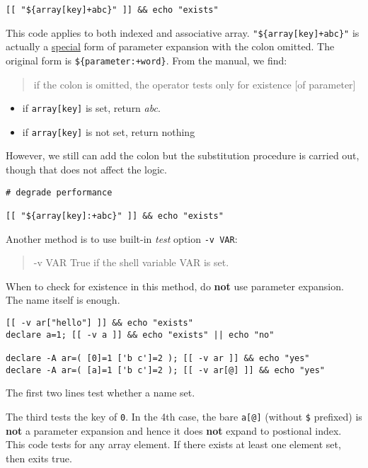 \begin{lstlisting}
[[ "${array[key]+abc}" ]] && echo "exists"
\end{lstlisting}

This code applies to both indexed and associative
array. \lstinline|"${array[key]+abc}"| is actually a
\uline{special} form of parameter expansion with the colon
omitted. The original form is
\lstinline|${parameter:+word}|. From the manual, we find:

\begin{quotation}
  if the colon is omitted, the operator tests only for existence [of parameter] 
\end{quotation}

\begin{itemize}
\item if \lstinline|array[key]| is set, return \textit{abc}.
\item if \lstinline|array[key]| is not set, return nothing
\end{itemize}

However, we still can add the colon but the substitution procedure
is carried out, though that does not affect the logic.

\begin{lstlisting}
# degrade performance

[[ "${array[key]:+abc}" ]] && echo "exists"
\end{lstlisting}

Another method is to use built-in \textit{test} option
\verb|-v VAR|:

\begin{quotation}
  -v VAR         True if the shell variable VAR is set.
\end{quotation}

When to check for existence in this method, do \textbf{not} use
parameter expansion. The name itself is enough.

\begin{lstlisting}
[[ -v ar["hello"] ]] && echo "exists"
declare a=1; [[ -v a ]] && echo "exists" || echo "no"

declare -A ar=( [0]=1 ['b c']=2 ); [[ -v ar ]] && echo "yes"
declare -A ar=( [a]=1 ['b c']=2 ); [[ -v ar[@] ]] && echo "yes"
\end{lstlisting}

The first two lines test whether a name set.

The third tests the key of \verb|0|. In the 4th case, the bare
\verb|a[@]| (without
\verb|$| prefixed) is \textbf{not} a parameter expansion and hence
it does \textbf{not} expand to postional index. This code tests
for any array element. If there exists at least one element set,
then exits true.

